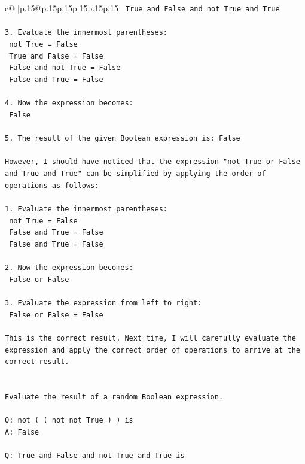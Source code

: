 \documentclass{article}
\begin{document}
{\begin{supertabular}{c@{$\;$}|p{.15\linewidth}@{}p{.15\linewidth}p{.15\linewidth}p{.15\linewidth}p{.15\linewidth}p{.15\linewidth}}
{{{\texttt{   True and False and not True and True} \\
\\ 
\texttt{3. Evaluate the innermost parentheses: } \\
\texttt{   not True = False} \\
\texttt{   True and False = False} \\
\texttt{   False and not True = False} \\
\texttt{   False and True = False} \\
\\ 
\texttt{4. Now the expression becomes: } \\
\texttt{   False} \\
\\ 
\texttt{5. The result of the given Boolean expression is: False} \\
\\ 
\texttt{However, I should have noticed that the expression "not True or False and True and True" can be simplified by applying the order of operations as follows:} \\
\\ 
\texttt{1. Evaluate the innermost parentheses: } \\
\texttt{   not True = False} \\
\texttt{   False and True = False} \\
\texttt{   False and True = False} \\
\\ 
\texttt{2. Now the expression becomes: } \\
\texttt{   False or False} \\
\\ 
\texttt{3. Evaluate the expression from left to right:} \\
\texttt{   False or False = False} \\
\\ 
\texttt{This is the correct result. Next time, I will carefully evaluate the expression and apply the correct order of operations to arrive at the correct result.} \\
\\ 
\\ 
\texttt{Evaluate the result of a random Boolean expression.} \\
\\ 
\texttt{Q: not ( ( not not True ) ) is} \\
\texttt{A: False} \\
\\ 
\texttt{Q: True and False and not True and True is} \\
}}}
\end{supertabular}}
\end{document}
